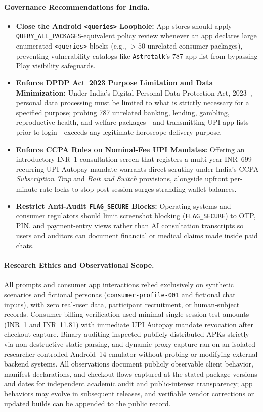 \paragraph{Governance Recommendations for India.}
\begin{itemize}[leftmargin=*,itemsep=2pt,topsep=3pt]
\item \textbf{Close the Android \texttt{<queries>} Loophole:} App stores should apply \texttt{QUERY\_ALL\_PACKAGES}-equivalent policy review whenever an app declares large enumerated \texttt{<queries>} blocks (e.g., $>50$ unrelated consumer packages), preventing vulnerability catalogs like \texttt{Astrotalk}'s 787-app list from bypassing Play visibility safeguards.
\item \textbf{Enforce DPDP Act~2023 Purpose Limitation and Data Minimization:} Under India's Digital Personal Data Protection Act, 2023~\citep{dpdp2023}, personal data processing must be limited to what is strictly necessary for a specified purpose; probing 787 unrelated banking, lending, gambling, reproductive-health, and welfare packages---and transmitting UPI app lists prior to login---exceeds any legitimate horoscope-delivery purpose.
\item \textbf{Enforce CCPA Rules on Nominal-Fee UPI Mandates:} Offering an introductory INR~1 consultation screen that registers a multi-year INR~699 recurring UPI Autopay mandate warrants direct scrutiny under India's CCPA \emph{Subscription Trap} and \emph{Bait and Switch} provisions, alongside upfront per-minute rate locks to stop post-session surges stranding wallet balances.
\item \textbf{Restrict Anti-Audit \texttt{FLAG\_SECURE} Blocks:} Operating systems and consumer regulators should limit screenshot blocking (\texttt{FLAG\_SECURE}) to OTP, PIN, and payment-entry views rather than AI consultation transcripts so users and auditors can document financial or medical claims made inside paid chats.
\end{itemize}

\paragraph{Research Ethics and Observational Scope.}
All prompts and consumer app interactions relied exclusively on synthetic scenarios and fictional personas (\texttt{consumer-profile-001} and fictional chat inputs), with zero real-user data, participant recruitment, or human-subject records. Consumer billing verification used minimal single-session test amounts (INR~1 and INR~11.81) with immediate UPI Autopay mandate revocation after checkout capture. Binary auditing inspected publicly distributed APKs strictly via non-destructive static parsing, and dynamic proxy capture ran on an isolated researcher-controlled Android~14 emulator without probing or modifying external backend systems. All observations document publicly observable client behavior, manifest declarations, and checkout flows captured at the stated package versions and dates for independent academic audit and public-interest transparency; app behaviors may evolve in subsequent releases, and verifiable vendor corrections or updated builds can be appended to the public record.

